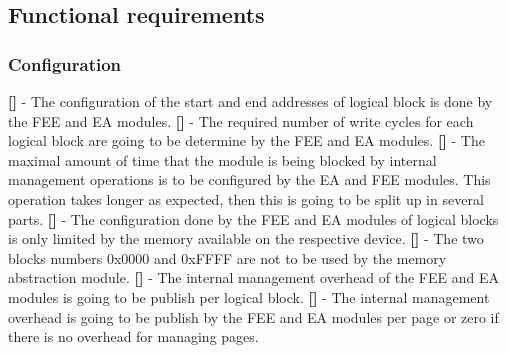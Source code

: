 \subsection{Functional requirements}
\subsubsection{Configuration}
{\bf []} - The configuration of the start and end addresses of logical block is done by the FEE and EA modules.\newline
\newline
{\bf []} - The required number of write cycles for each logical block are going to be determine by the FEE and EA modules.\newline
\newline
{\bf []} - The maximal amount of time that the module is being blocked by internal management operations is to be configured by the EA and FEE modules. This operation takes longer as expected, then this is going to be split up in several parts.\newline
\newline
{\bf []} - The configuration done by the FEE and EA modules of logical blocks is only limited by the memory available on the respective device.\newline
\newline
{\bf []} - The two blocks numbers 0x0000 and 0xFFFF are not to be used by the memory abstraction module.\newline
\newline
{\bf []} - The internal management overhead of the FEE and EA modules is going to be publish per logical block.\newline
\newline
{\bf []} - The internal management overhead is going to be publish by the FEE and EA modules per page or zero if there is no overhead for managing pages.

